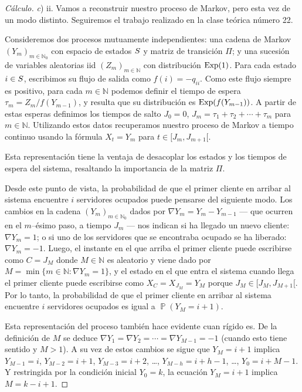 \documentclass{article}
\DeclareMathOperator{\prob}{\mathbb{P}}
\DeclareMathOperator{\Exponential}{\textnormal{Exp}}
\newcommand{\naturalnum}{\mathbb{N}}
\theoremstyle{definition}
\begin{document}
\begin{proof}[Cálculo] \textit{c}) ii.
Vamos a reconstruir nuestro proceso de Markov, pero esta vez de un modo distinto.
Seguiremos el trabajo realizado en la clase teórica número 22.

Consideremos dos procesos mutuamente independientes: una cadena de Markov \((Y_m)_{m \in \naturalnum_0}\) con espacio de estados \(S\) y matriz de transición \(\Pi\); y una sucesión de variables aleatorias iid \((Z_m)_{m \in \naturalnum}\) con distribución \(\Exponential(1)\).
Para cada estado \(i \in S\), escribimos su flujo de salida como \(f(i) = - q_{ii}\).
Como este flujo siempre es positivo, para cada \(m \in \naturalnum\) podemos definir el tiempo de espera \(\tau_m = Z_m / f(Y_{m - 1})\), y resulta que su distribución es \(\Exponential(f(Y_{m - 1}))\).
A partir de estas esperas definimos los tiempos de salto \(J_0 = 0\), \(J_m = \tau_1 + \tau_2 + \cdots + \tau_m\) para \(m \in \naturalnum\).
Utilizando estos datos recuperamos nuestro proceso de Markov a tiempo continuo usando la fórmula \(X_t = Y_m\) para \( t \in [J_m, J_{m + 1}[\).

Esta representación tiene la ventaja de desacoplar los estados y los tiempos de espera del sistema, resaltando la importancia de la matriz \(\Pi\).

Desde este punto de vista, la probabilidad de que el primer cliente en arribar al sistema encuentre \(i\) servidores ocupados puede pensarse del siguiente modo.
Los cambios en la cadena \((Y_m)_{m \in \naturalnum_0}\) dados por \(\nabla Y_m = Y_m - Y_{m - 1}\) --- que ocurren en el \(m\)--ésimo paso, a tiempo \(J_m\) --- nos indican si ha llegado un nuevo cliente: \(\nabla Y_m = 1\); o si uno de los servidores que se encontraba ocupado se ha liberado: \(\nabla Y_m = - 1\).
Luego, el instante en el que arriba el primer cliente puede escribirse como \(C = J_M\) donde \(M \in \naturalnum\) es aleatorio y viene dado por \(M = \min \{m \in \naturalnum : \nabla Y_m = 1\}\), y el estado en el que entra el sistema cuando llega el primer cliente puede escribirse como \(X_C = X_{J_M} = Y_M\) porque \(J_M \in [J_M, J_{M + 1}[\).
Por lo tanto, la probabilidad de que el primer cliente en arribar al sistema encuentre \(i\) servidores ocupados es igual a \(\prob(Y_M = i + 1)\).

Esta representación del proceso también hace evidente cuan rígido es.
De la definición de \(M\) se deduce \(\nabla Y_1 = \nabla Y_2 = \cdots = \nabla Y_{M - 1} = - 1\) (cuando esto tiene sentido y \(M > 1\)).
A su vez de estos cambios se sigue que \(Y_M = i + 1\) implica \(Y_{M - 1} = i\), \(Y_{M - 2} = i + 1\), \(Y_{M - 3} = i + 2\), \dots, \(Y_{M - h} = i + h - 1\), \dots, \(Y_0 = i + M - 1\).
Y restringida por la condición inicial \(Y_0 = k\), la ecuación \(Y_M = i + 1\) implica \(M = k - i + 1\).


\end{proof}
\end{document}
